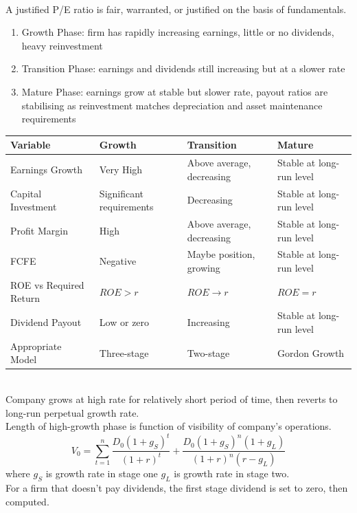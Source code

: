 \begin{remark} \\
A justified P/E ratio is fair, warranted, or justified on the basis of fundamentals.
\begin{enumerate}[label=\roman*.]
\setlength{\itemsep}{0pt}
\item Growth Phase: firm has rapidly increasing earnings, little or no dividends, heavy reinvestment
\item Transition Phase: earnings and dividends still increasing but at a slower rate
\item Mature Phase: earnings grow at stable but slower rate, payout ratios are stabilising as reinvestment matches depreciation and asset maintenance requirements
\end{enumerate}
\end{remark}

\begin{flushleft}
\begin{tabularx}{\textwidth}{p{11em}|p{10.5em}|p{12em}|X}
\hline
\rowcolor{gray!30}
Variable & Growth & Transition & Mature \\
\hline 
Earnings Growth & Very High & Above average, decreasing & Stable at long-run level \\
\hline
Capital Investment & Significant requirements & Decreasing & Stable at long-run level \\
\hline
Profit Margin & High &  Above average, decreasing & Stable at long-run level \\
\hline
FCFE & Negative & Maybe position, growing & Stable at long-run level \\
\hline
ROE vs Required Return & $ROE > r$ & $ROE \rightarrow r$ & $ROE = r$ \\
\hline
Dividend Payout & Low or zero & Increasing & Stable at long-run level \\
\hline
Appropriate Model & Three-stage & Two-stage & Gordon Growth \\
\hline
\end{tabularx} 
\end{flushleft}

\begin{method} \\
Company grows at high rate for relatively short period of time, then reverts to long-run perpetual growth rate.\\
Length of high-growth phase is function of visibility of company's operations.
\begin{equation}
V_0 = \sum\limits_{t=1}^n \frac{D_0 (1+g_S)^t}{(1+r)^t} + \frac{D_0 (1+g_S)^n (1+g_L)}{(1+r)^n (r-g_L)} \nonumber
\end{equation}
where $g_S$ is growth rate in stage one $g_L$ is growth rate in stage two.\\
For a firm that doesn't pay dividends, the first stage dividend is set to zero, then computed.
\end{method}

